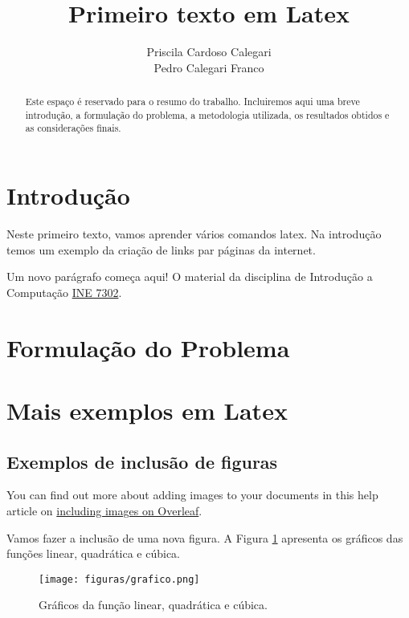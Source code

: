 \documentclass[11pt]{article}
\title{Primeiro texto em Latex}
\author{Priscila Cardoso Calegari\\
Pedro Calegari Franco}
\begin{document}
\maketitle

\begin{abstract}
Este espaço é reservado para o resumo do trabalho. Incluiremos aqui uma breve introdução, a formulação do problema, a metodologia utilizada, os resultados obtidos e as considerações finais.
\end{abstract}

\section{Introdução}

\hspace{1pc} Neste primeiro texto, vamos aprender vários comandos latex. Na introdução temos um exemplo da criação de links par páginas da internet.

Um novo parágrafo começa aqui! O material da disciplina de Introdução a Computação \href{https://presencial.moodle.ufsc.br/}{INE 7302}.

\section{Formulação do Problema}

\section{Mais exemplos em Latex}

\subsection{Exemplos de inclusão de figuras}

\hspace{1pc} You can find out more about adding images to your documents in this help article on \href{https://www.overleaf.com/learn/how-to/Including_images_on_Overleaf}{including images on Overleaf}.

Vamos fazer a inclusão de uma nova figura. A Figura \ref{graf1} apresenta os gráficos das funções linear, quadrática e cúbica.

\begin{figure}
\centering
\texttt{[image: figuras/grafico.png]}
\caption{\label{graf1}Gráficos da função linear, quadrática e cúbica.}
\end{figure}
\end{document}

